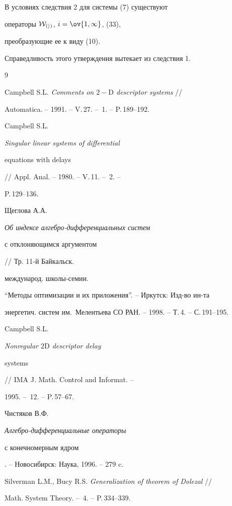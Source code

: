 \begin{cor}


В условиях следствия 2 для системы (7) существуют


операторы $\cal W_{(i)}$, $i=\ov{1,\infty}$, (33),


преобразующие ее к виду (10).


\end{cor}





Справедливость этого утверждения вытекает из следствия 1.








\begin{thebibliography}{9}







Campbell S.L. {\em Comments on $2{-}\mathrm D$ descriptor systems} //


Automatica. -- 1991. -- V.\,27. -- \No\,1. -- P.\,189--192.




Campbell S.L. {\em Singular linear systems of differential


equations with delays} // Appl. Anal. -- 1980. -- V.\,11. -- \No\,2. --


P.\,129--136.




Щеглова А.А. {\em Об индексе алгебро-дифференциальных систем


с отклоняющимся аргументом} // Тр. 11-й Байкальск.


международ. школы-семин.


``Методы оптимизации и их приложения''. -- Иркутск: Изд-во ин-та


энергетич. систем им.~Мелентьева СО РАН. -- 1998. -- Т.\,4. -- С.\,191--195.




Campbell S.L. {\em Nonregular $2\mathrm D$ descriptor delay


systems} // IMA J. Math. Control and Informat. --


1995. -- \No\,12. -- P.\,57--67.




Чистяков В.Ф. {\em Алгебро-дифференциальные операторы


с конечномерным ядром}. -- Новосибирск: Наука, 1996. -- 279 c.




Silverman L.M., Bucy R.S. {\em Generalization of theorem of Dolezal} //


Math. System Theory. -- \No\,4. -- P.\,334--339.





\end{thebibliography}





